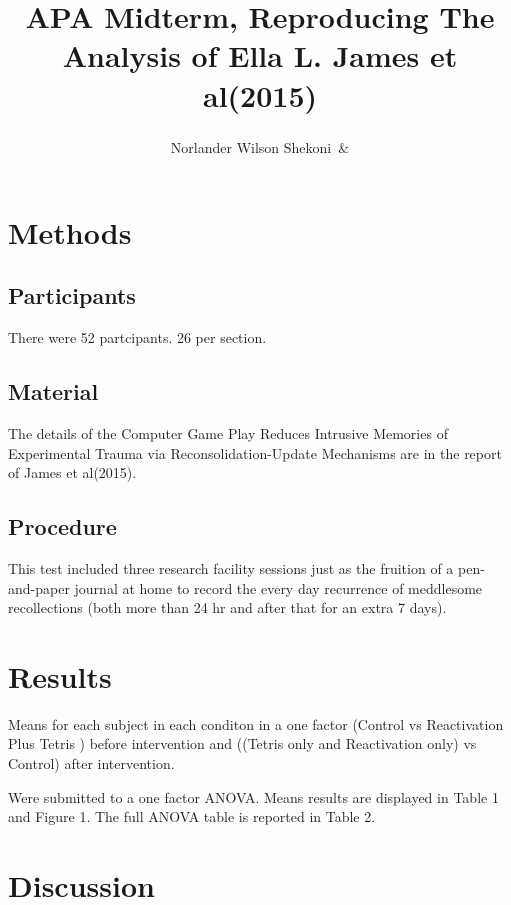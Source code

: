 \documentclass[man]{apa6}
\title{APA Midterm, Reproducing The Analysis of Ella L. James et al(2015)}
\author{Norlander Wilson Shekoni\textsuperscript{}~\&}
\date{}
\affiliation{
\vspace{0.5cm}
\textsuperscript{1} Brooklyn College City University Of New York\\\textsuperscript{} }
\begin{document}
\maketitle

\section{Methods}\label{methods}

\subsection{Participants}\label{participants}

There were 52 partcipants. 26 per section.

\subsection{Material}\label{material}

The details of the Computer Game Play Reduces Intrusive Memories of
Experimental Trauma via Reconsolidation-Update Mechanisms are in the
report of James et al(2015).

\subsection{Procedure}\label{procedure}

This test included three research facility sessions just as the fruition
of a pen-and-paper journal at home to record the every day recurrence of
meddlesome recollections (both more than 24 hr and after that for an
extra 7 days).

\section{Results}\label{results}

Means for each subject in each conditon in a one factor (Control vs
Reactivation Plus Tetris ) before intervention and ((Tetris only and
Reactivation only) vs Control) after intervention.

Were submitted to a one factor ANOVA. Means results are displayed in
Table 1 and Figure 1. The full ANOVA table is reported in Table 2.

\section{Discussion}\label{discussion}
\end{document}
